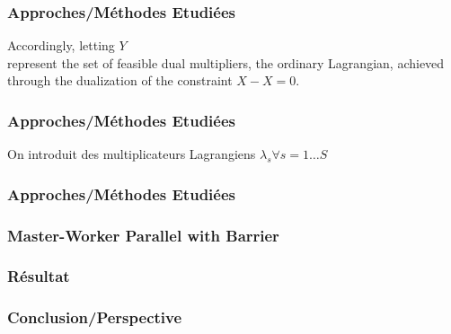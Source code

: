\documentclass[10pt]{beamer}
\begin{document}
    \begin{frame}
        \frametitle{Approches/Méthodes Etudiées}
        Accordingly, letting $Y$\\ %
        represent the set of feasible dual multipliers, the ordinary Lagrangian, achieved through the dualization
of the constraint $X - X = 0$.
    \end{frame}
    
    
    \begin{frame}
        \frametitle{Approches/Méthodes Etudiées}
        On introduit des multiplicateurs Lagrangiens $\lambda_s \forall s = 1 \ldots S$
    \end{frame}
    
    \begin{frame}
        \frametitle{Approches/Méthodes Etudiées}
    \end{frame}
    
    \begin{frame}
        \frametitle{Master-Worker Parallel with Barrier}            
    \end{frame}
        
    \begin{frame}
        \frametitle{Résultat}
    \end{frame}
        
    \begin{frame}
        \frametitle{Conclusion/Perspective}
    \end{frame}
    
    \iffalse
    \fi
\end{document}
